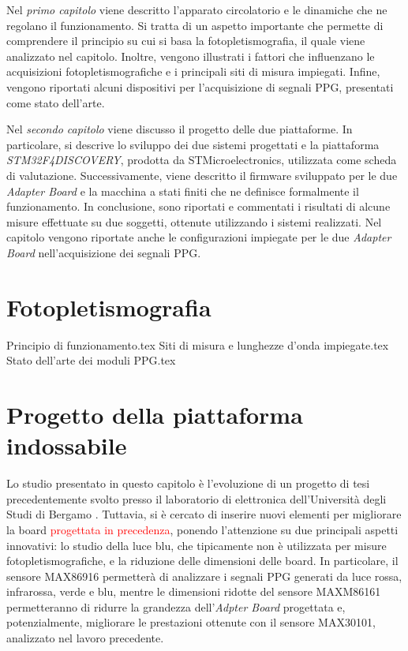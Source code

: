 \documentclass[
	a4paper,
	cleardoublepage=empty,
	headings=twolinechapter,
	numbers=autoenddot,
]{scrbook}
\begin{document}
	Nel \textit{primo capitolo} viene descritto l'apparato circolatorio e le dinamiche che ne regolano il funzionamento. Si tratta di un aspetto importante che permette di comprendere il principio su cui si basa la fotopletismografia, il quale viene analizzato nel capitolo. Inoltre, vengono illustrati i fattori che influenzano le acquisizioni fotopletismografiche e i principali siti di misura impiegati. Infine, vengono riportati alcuni dispositivi per l'acquisizione di segnali PPG, presentati come stato dell'arte.
	
	Nel \textit{secondo capitolo} viene discusso il progetto delle due piattaforme. In particolare, si descrive lo sviluppo dei due sistemi progettati e la piattaforma \textit{STM32F4DISCOVERY}, prodotta da STMicroelectronics, utilizzata come scheda di valutazione. Successivamente, viene descritto il firmware sviluppato per le due \textit{Adapter Board} e la macchina a stati finiti che ne definisce formalmente il funzionamento. In conclusione, sono riportati e commentati i risultati di alcune misure effettuate su due soggetti, ottenute utilizzando i sistemi realizzati. Nel capitolo vengono riportate anche le configurazioni impiegate per le due \textit{Adapter Board} nell'acquisizione dei segnali PPG.
	
	\chapter{Fotopletismografia}
	{Principio di funzionamento.tex}
	{Siti di misura e lunghezze d’onda impiegate.tex}
	{Stato dell’arte dei moduli PPG.tex}
	
	\chapter{Progetto della piattaforma indossabile}
	Lo studio presentato in questo capitolo è l'evoluzione di un progetto di tesi precedentemente svolto presso il laboratorio di elettronica dell’Università degli Studi di Bergamo \cite{Ingegneria2018}. Tuttavia, si è cercato di inserire nuovi elementi per migliorare la board \textcolor{red}{progettata in precedenza}, ponendo l'attenzione su due principali aspetti innovativi: lo studio della luce blu, che tipicamente non è utilizzata per misure fotopletismografiche, e la riduzione delle dimensioni delle board. In particolare, il sensore MAX86916 permetterà di analizzare i segnali PPG generati da luce rossa, infrarossa, verde e blu, mentre le dimensioni ridotte del sensore MAXM86161 permetteranno di ridurre la grandezza dell'\textit{Adpter Board} progettata e, potenzialmente, migliorare le prestazioni ottenute con il sensore MAX30101, analizzato nel lavoro precedente\cite{Ingegneria2018}.
	
\end{document}
